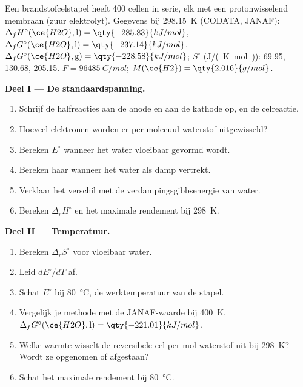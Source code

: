\begin{problem}
\label{pb:b2:cell-thermodynamics:1}
Een brandstofcelstapel heeft 400 cellen in serie, elk met een protonwisselend
membraan (zuur elektrolyt). Gegevens bij \qty{298.15}{K} (CODATA, JANAF):
$\Delta_f H^\circ(\ce{H2O}, \text{l}) = \qty{-285.83}{kJ/mol}$, $\Delta_f
G^\circ(\ce{H2O}, \text{l}) = \qty{-237.14}{kJ/mol}$, $\Delta_f G^\circ(\ce{H2O},
\text{g}) = \qty{-228.58}{kJ/mol}$; $S^\circ$ (\unit{J/(K.mol)}):  69.95,
 130.68,  205.15. $F = \qty{96485}{C/mol}$; $M(\ce{H2}) =
\qty{2.016}{g/mol}$.

\medskip
\noindent\textbf{Deel I --- De standaardspanning.}
\begin{enumerate}
  \item Schrijf de halfreacties aan de anode en aan de kathode op, en de
        celreactie.
  \item Hoeveel elektronen worden er per molecuul waterstof uitgewisseld?
  \item Bereken $E^\circ$ wanneer het water vloeibaar gevormd wordt.
  \item Bereken haar wanneer het water als damp vertrekt.
  \item Verklaar het verschil met de verdampingsgibbsenergie van water.
  \item Bereken $\Delta_r H^\circ$ en het maximale rendement bij \qty{298}{K}.
\end{enumerate}

\medskip
\noindent\textbf{Deel II --- Temperatuur.}
\begin{enumerate}[resume]
  \item Bereken $\Delta_r S^\circ$ voor vloeibaar water.
  \item Leid $dE^\circ/dT$ af.
  \item Schat $E^\circ$ bij \qty{80}{\degreeCelsius}, de werktemperatuur van de
        stapel.
  \item Vergelijk je methode met de JANAF-waarde bij \qty{400}{K}, $\Delta_f
        G^\circ(\ce{H2O}, \text{l}) = \qty{-221.01}{kJ/mol}$.
  \item Welke warmte wisselt de reversibele cel per mol waterstof uit bij
        \qty{298}{K}? Wordt ze opgenomen of afgestaan?
  \item Schat het maximale rendement bij \qty{80}{\degreeCelsius}.
\end{enumerate}


\end{problem}
